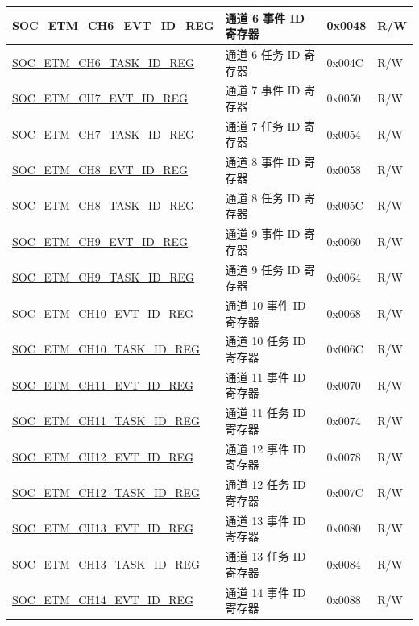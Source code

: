 \begin{longtable}{ | p{6cm} | p{6.4cm} | p{1.3cm} | p{1.8cm} | }
\hyperref[regdesc:SOCETMCH0EVTIDREG]{SOC\_ETM\_CH6\_EVT\_ID\_REG} & 通道 6 事件 ID 寄存器 & 0x0048 & R/W \\ \hline
\hyperref[regdesc:SOCETMCH0TASKIDREG]{SOC\_ETM\_CH6\_TASK\_ID\_REG} & 通道 6 任务 ID 寄存器 & 0x004C & R/W \\ \hline
\hyperref[regdesc:SOCETMCH0EVTIDREG]{SOC\_ETM\_CH7\_EVT\_ID\_REG} & 通道 7 事件 ID 寄存器 & 0x0050 & R/W \\ \hline
\hyperref[regdesc:SOCETMCH0TASKIDREG]{SOC\_ETM\_CH7\_TASK\_ID\_REG} & 通道 7 任务 ID 寄存器 & 0x0054 & R/W \\ \hline
\hyperref[regdesc:SOCETMCH0EVTIDREG]{SOC\_ETM\_CH8\_EVT\_ID\_REG} & 通道 8 事件 ID 寄存器 & 0x0058 & R/W \\ \hline
\hyperref[regdesc:SOCETMCH0TASKIDREG]{SOC\_ETM\_CH8\_TASK\_ID\_REG} & 通道 8 任务 ID 寄存器 & 0x005C & R/W \\ \hline
\hyperref[regdesc:SOCETMCH0EVTIDREG]{SOC\_ETM\_CH9\_EVT\_ID\_REG} & 通道 9 事件 ID 寄存器 & 0x0060 & R/W \\ \hline
\hyperref[regdesc:SOCETMCH0TASKIDREG]{SOC\_ETM\_CH9\_TASK\_ID\_REG} & 通道 9 任务 ID 寄存器 & 0x0064 & R/W \\ \hline
\hyperref[regdesc:SOCETMCH0EVTIDREG]{SOC\_ETM\_CH10\_EVT\_ID\_REG} & 通道 10 事件 ID 寄存器 & 0x0068 & R/W \\ \hline
\hyperref[regdesc:SOCETMCH0TASKIDREG]{SOC\_ETM\_CH10\_TASK\_ID\_REG} & 通道 10 任务 ID 寄存器 & 0x006C & R/W \\ \hline
\hyperref[regdesc:SOCETMCH0EVTIDREG]{SOC\_ETM\_CH11\_EVT\_ID\_REG} & 通道 11 事件 ID 寄存器 & 0x0070 & R/W \\ \hline
\hyperref[regdesc:SOCETMCH0TASKIDREG]{SOC\_ETM\_CH11\_TASK\_ID\_REG} & 通道 11 任务 ID 寄存器 & 0x0074 & R/W \\ \hline
\hyperref[regdesc:SOCETMCH0EVTIDREG]{SOC\_ETM\_CH12\_EVT\_ID\_REG} & 通道 12 事件 ID 寄存器 & 0x0078 & R/W \\ \hline
\hyperref[regdesc:SOCETMCH0TASKIDREG]{SOC\_ETM\_CH12\_TASK\_ID\_REG} & 通道 12 任务 ID 寄存器 & 0x007C & R/W \\ \hline
\hyperref[regdesc:SOCETMCH0EVTIDREG]{SOC\_ETM\_CH13\_EVT\_ID\_REG} & 通道 13 事件 ID 寄存器 & 0x0080 & R/W \\ \hline
\hyperref[regdesc:SOCETMCH0TASKIDREG]{SOC\_ETM\_CH13\_TASK\_ID\_REG} & 通道 13 任务 ID 寄存器 & 0x0084 & R/W \\ \hline
\hyperref[regdesc:SOCETMCH0EVTIDREG]{SOC\_ETM\_CH14\_EVT\_ID\_REG} & 通道 14 事件 ID 寄存器 & 0x0088 & R/W \\ \hline

\end{longtable}
